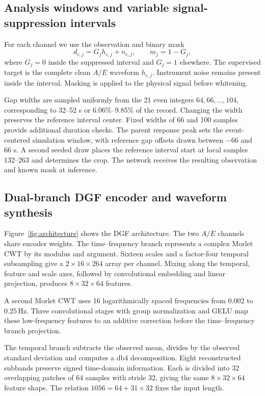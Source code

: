 \documentclass[10pt,prd,aps,a4paper,twocolumn,superscriptaddress,nofootinbib,floatfix]{revtex4-2}
\begin{document}
\subsection{Analysis windows and variable signal-suppression intervals}\label{sec:gaps}
For each channel we use the observation and binary mask
\begin{equation}
d_{c,j}=G_jh_{c,j}+n_{c,j},\qquad m_j=1-G_j,\label{eq:observation}
\end{equation}
where $G_j=0$ inside the suppressed interval and $G_j=1$ elsewhere. The supervised target is the complete clean $A/E$ waveform $h_{c,j}$. Instrument noise remains present inside the interval. Masking is applied to the physical signal before whitening.

Gap widths are sampled uniformly from the 21 even integers $64,66,\ldots,104$, corresponding to 32--52 s or 6.06\%--9.85\% of the record. Changing the width preserves the reference interval center. Fixed widths of 66 and 100 samples provide additional duration checks. The parent response peak sets the event-centered simulation window, with reference gap offsets drawn between $-66$ and $66$ s. A second seeded draw places the reference interval start at local samples 132--263 and determines the crop. The network receives the resulting observation and known mask at inference.

\subsection{Dual-branch DGF encoder and waveform synthesis}\label{sec:architecture}
Figure~\ref{fig:architecture} shows the DGF architecture. The two $A/E$ channels share encoder weights. The time--frequency branch represents a complex Morlet CWT by its modulus and argument. Sixteen scales and a factor-four temporal subsampling give a $2\times16\times264$ array per channel. Mixing along the temporal, feature and scale axes, followed by convolutional embedding and linear projection, produces $8\times32\times64$ features.

A second Morlet CWT uses 16 logarithmically spaced frequencies from $0.002$ to $0.25\,\mathrm{Hz}$. Three convolutional stages with group normalization and GELU map these low-frequency features to an additive correction before the time--frequency branch projection.

The temporal branch subtracts the observed mean, divides by the observed standard deviation and computes a db4 decomposition. Eight reconstructed subbands preserve signed time-domain information. Each is divided into 32 overlapping patches of 64 samples with stride 32, giving the same $8\times32\times64$ feature shape. The relation $1056=64+31\times32$ fixes the input length.
\end{document}
